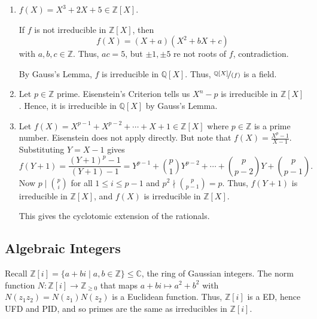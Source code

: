 \begin{example}
    \begin{enumerate}
        \item \(f(X) = X^3 + 2X + 5 \in \mathbb{Z}[X]\).

        If \(f\) is not irreducible in \(\mathbb{Z}[X]\), then
        \[
            f(X) = (X+a)(X^2 + bX + c)
        \]
        with \(a,b,c \in \mathbb{Z}\). Thus, \(ac = 5\), but \(\pm 1, \pm 5\) re not roots of \(f\), contradiction.

        By Gauss's Lemma, \(f\) is irreducible in \(\mathbb{Q}[X]\). Thus, \(\nicefrac{\mathbb{Q}[X]}{(f)}\) is a field.
        \item Let \(p \in \mathbb{Z}\) prime. Eisenstein's Criterion tells us \(X^n - p\) is irreducible in \(\mathbb{Z}[X]\). Hence, it is irreducible in \(\mathbb{Q}[X]\) by Gauss's Lemma.
        \item Let \(f(X) = X^{p-1} + X^{p-2} + \cdots + X + 1 \in \mathbb{Z}[X]\) where \(p \in \mathbb{Z}\) is a prime number. Eisenstein does not apply directly. But note that \(f(X) = \frac{X^p - 1}{X - 1}\). Substituting \(Y = X - 1\) gives
        \[f(Y+1) = \frac{(Y+1)^p - 1}{(Y+1)-1} =Y^{p-1} + \binom{p}{1}Y^{p-2} + \cdots + \binom{p}{p-2}Y + \binom{p}{p-1}.\]
        Now \(p \mid \binom{p}{i}\) for all \(1\leq i \leq p-1\) and \(p^2 \nmid \binom{p}{p-1}=p\). Thus, \(f(Y+1)\) is irreducible in \(\mathbb{Z}[X]\), and \(f(X)\) is irreducible in \(\mathbb{Z}[X]\).
        
        This gives the cyclotomic extension of the rationals.
    \end{enumerate}
\end{example}
\subsection{Algebraic Integers}
Recall \(\mathbb{Z}[i] = \{a + bi \mid a, b \in \mathbb{Z}\} \leq \mathbb{C}\), the ring of Gaussian integers. The norm function \(N: \mathbb{Z}[i] \to \mathbb{Z}_{\geq 0}\) that maps \(a + bi \mapsto a^2 + b^2\) with \(N(z_1 z_2) = N(z_1)N(z_2)\) is a Euclidean function. Thus, \(\mathbb{Z}[i]\) is a ED, hence UFD and PID, and so primes are the same as irreducibles in \(\mathbb{Z}[i]\).

